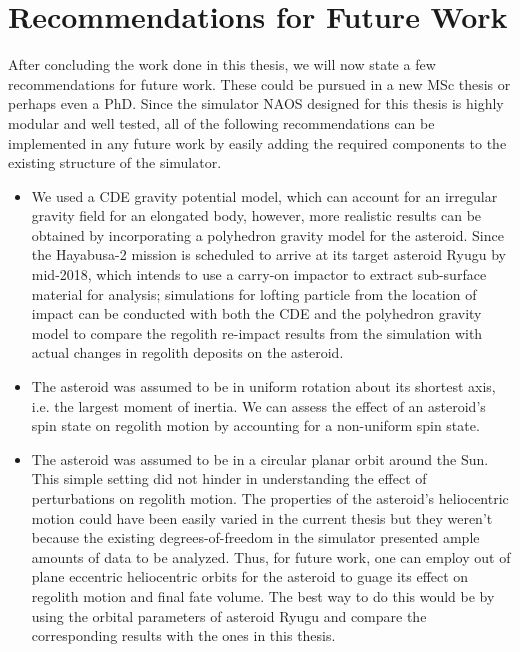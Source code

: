 \chapter{Recommendations for Future Work}
\label{chap:recommendations}
\graphicspath{{Recommendations/Images/}}

After concluding the work done in this thesis, we will now state a few recommendations for future work. These could be pursued in a new MSc thesis or perhaps even a PhD. Since the simulator \gls{NAOS} designed for this thesis is highly modular and well tested, all of the following recommendations can be implemented in any future work by easily adding the required components to the existing structure of the simulator.

\begin{itemize}
\item We used a \gls{CDE} gravity potential model, which can account for an irregular gravity field for an elongated body, however, more realistic results can be obtained by incorporating a polyhedron gravity model for the asteroid. Since the Hayabusa-2 mission is scheduled to arrive at its target asteroid Ryugu by mid-2018, which intends to use a carry-on impactor to extract sub-surface material for analysis; simulations for lofting particle from the location of impact can be conducted with both the \gls{CDE} and the polyhedron gravity model to compare the regolith re-impact results from the simulation with actual changes in regolith deposits on the asteroid.

\item The asteroid was assumed to be in uniform rotation about its shortest axis, i.e. the largest moment of inertia. We can assess the effect of an asteroid's spin state on regolith motion by accounting for a non-uniform spin state.

\item The asteroid was assumed to be in a circular planar orbit around the Sun. This simple setting did not hinder in understanding the effect of perturbations on regolith motion. The properties of the asteroid's heliocentric motion could have been easily varied in the current thesis but they weren't because the existing degrees-of-freedom in the simulator presented ample amounts of data to be analyzed. Thus, for future work, one can employ out of plane eccentric heliocentric orbits for the asteroid to guage its effect on regolith motion and final fate volume. The best way to do this would be by using the orbital parameters of asteroid Ryugu and compare the corresponding results with the ones in this thesis.


\end{itemize}
